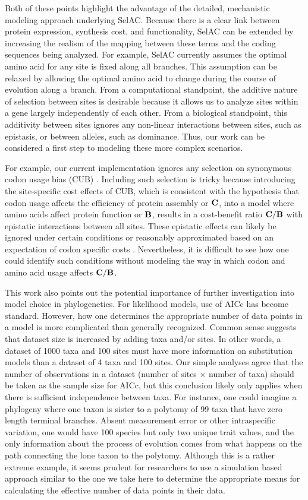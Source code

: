 \documentclass[onecolumn,letterpaper,fleqn,nogrid]{myMBE}%
\newcommand{\Cost}{\ensuremath{\text{\textbf{C}}}\xspace}
\newcommand{\Func}{\ensuremath{\text{\textbf{B}}}\xspace}
\newcommand{\selac}{SelAC\xspace}
\begin{document}
Both of these points highlight the advantage of the detailed, mechanistic modeling approach underlying \selac.
Because there is a clear link between protein expression, synthesis cost, and functionality, \selac can be extended by increasing the realism of the mapping between these terms and the coding sequences being analyzed.
For example, \selac currently assumes the optimal amino acid for any site is fixed along all branches.
This assumption can be relaxed by allowing the optimal amino acid to change during the course of evolution along a branch.
From a computational standpoint, the additive nature of selection between sites is desirable because it allows us to analyze sites within a gene largely independently of each other.
From a biological standpoint, this additivity between sites ignores any non-linear interactions between sites, such as epistasis, or between alleles, such as dominance.
Thus, our work can be considered a first step to modeling these more complex scenarios.

For example, our current implementation ignores any selection on synonymous codon usage bias (CUB) \citep[c.f.~][]{YangAndNielsen2008,PouyetEtAl2016}.
Including such selection is tricky because introducing the site-specific cost effects of CUB, which is consistent with the hypothesis that codon usage affects the efficiency of protein assembly or \Cost, into a model where amino acids affect protein function or \Func, results in a cost-benefit ratio $\Cost/\Func$ with epistatic interactions between all sites.
These epistatic effects can likely be ignored under certain conditions or reasonably approximated based on an expectation of codon specific costs \citep[e.g.~][]{KubatkoEtAl2016}.
Nevertheless, it is difficult to see how one could identify such conditions without modeling the way in which codon and amino acid usage affects $\Cost/\Func$.

This work also points out the potential importance of further investigation into model choice in phylogenetics.
For likelihood models, use of AICc has become standard.
However, how one determines the appropriate number of data points in a model is more complicated than generally recognized.
Common sense suggests that dataset size is increased by adding taxa and/or sites.
In other words, a dataset of 1000 taxa and 100 sites must have more information on substitution models than a dataset of 4 taxa and 100 sites.
Our simple analyses agree that the number of observations in a dataset (number of sites $\times$ number of taxa) should be taken as the sample size for AICc, but this conclusion likely only applies when there is sufficient independence between taxa.
For instance, one could imagine a phylogeny where one taxon is sister to a polytomy of 99 taxa that have zero length terminal branches.
Absent measurement error or other intraspecific variation, one would have 100 species but only two unique trait values, and the only information about the process of evolution comes from what happens on the path connecting the lone taxon to the polytomy.
Although this is a rather extreme example, it seems prudent for researchers to use a simulation based approach similar to the one we take here to determine the appropriate means for calculating the effective number of data points in their data.
\end{document}
